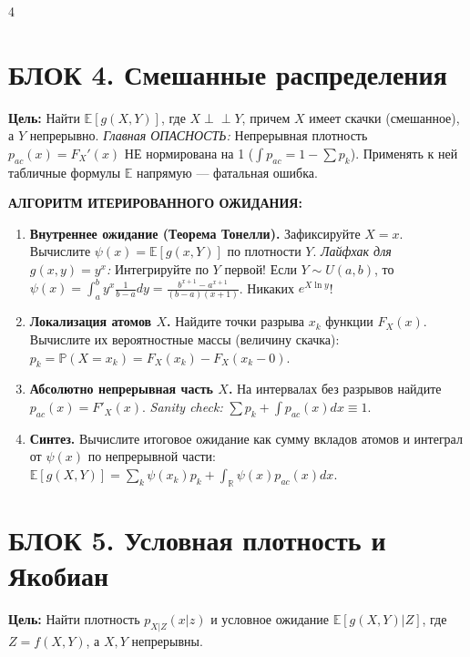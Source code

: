 \documentclass[a4paper, landscape]{article}
\newcommand{\E}{\mathbb{E}}
\renewcommand{\P}{\mathbb{P}}
\begin{document}
\begin{multicols*}{4}
\section*{БЛОК 4. Смешанные распределения}
\textbf{Цель:} Найти $\E[g(X,Y)]$, где $X \perp\!\!\perp Y$, причем $X$ имеет скачки (смешанное), а $Y$ непрерывно.
\textit{Главная ОПАСНОСТЬ:} Непрерывная плотность $p_{ac}(x) = F_X'(x)$ НЕ нормирована на 1 ($\int p_{ac} = 1 - \sum p_k$). Применять к ней табличные формулы $\E$ напрямую — фатальная ошибка.

\textbf{АЛГОРИТМ ИТЕРИРОВАННОГО ОЖИДАНИЯ:}
\begin{enumerate}[label=\textbf{Шаг \arabic*.}, leftmargin=*]
    \item \textbf{Внутреннее ожидание (Теорема Тонелли).} Зафиксируйте $X=x$. Вычислите $\psi(x) = \E[g(x,Y)]$ по плотности $Y$. 
    \textit{Лайфхак для $g(x,y)=y^x$:} Интегрируйте по $Y$ первой! Если $Y \!\sim\! U(a,b)$, то $\psi(x) = \int_a^b y^x \frac{1}{b-a} dy = \frac{b^{x+1}-a^{x+1}}{(b-a)(x+1)}$. Никаких $e^{X\ln y}$!
    \item \textbf{Локализация атомов $X$.} Найдите точки разрыва $x_k$ функции $F_X(x)$. Вычислите их вероятностные массы (величину скачка): $p_k = \P(X = x_k) = F_X(x_k) - F_X(x_k-0)$.
    \item \textbf{Абсолютно непрерывная часть $X$.} На интервалах без разрывов найдите $p_{ac}(x) = F'_X(x)$.
    \textit{Sanity check:} $\sum p_k + \int p_{ac}(x)dx \equiv 1$.
    \item \textbf{Синтез.} Вычислите итоговое ожидание как сумму вкладов атомов и интеграл от $\psi(x)$ по непрерывной части:
    $ \E[g(X,Y)] = \sum_{k} \psi(x_k) p_k + \int_{\mathbb{R}} \psi(x) p_{ac}(x) dx $.
\end{enumerate}

\section*{БЛОК 5. Условная плотность и Якобиан}
\textbf{Цель:} Найти плотность $p_{X|Z}(x|z)$ и условное ожидание $\E[g(X,Y)|Z]$, где $Z = f(X,Y)$, а $X, Y$ непрерывны.


\end{multicols*}
\end{document}
